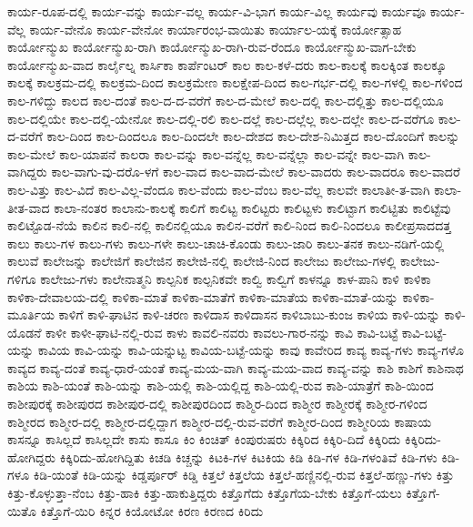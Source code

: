 {ಕಾರ್ಯ-ರೂಪ-ದಲ್ಲಿ
ಕಾರ್ಯ-ವನ್ನು
ಕಾರ್ಯ-ವಲ್ಲ
ಕಾರ್ಯ-ವಿ-ಭಾಗ
ಕಾರ್ಯ-ವಿಲ್ಲ
ಕಾರ್ಯವು
ಕಾರ್ಯವೂ
ಕಾರ್ಯ-ವೆಲ್ಲ
ಕಾರ್ಯ-ವೇನೊ
ಕಾರ್ಯ-ವೇನೋ
ಕಾರ್ಯಾರಂಭ-ವಾಯಿತು
ಕಾರ್ಯಾಲ-ಯಕ್ಕೆ
ಕಾರ್ಯೋತ್ಸಾಹ
ಕಾರ್ಯೋನ್ಮುಖ
ಕಾರ್ಯೋನ್ಮುಖ-ರಾಗಿ
ಕಾರ್ಯೋನ್ಮುಖ-ರಾಗಿ-ರುವ-ರೆಂದೂ
ಕಾರ್ಯೋನ್ಮುಖ-ವಾಗ-ಬೇಕು
ಕಾರ್ಯೋನ್ಮುಖ-ವಾದ
ಕಾರ್ಲೈಲ್ನ
ಕಾರ್ಸಿಕಾ
ಕಾರ್ಪೆಂಟರ್
ಕಾಲ
ಕಾಲ-ಕಳೆ-ದರು
ಕಾಲ-ಕಾಲಕ್ಕೆ
ಕಾಲಕ್ಕಿಂತ
ಕಾಲಕ್ಕೂ
ಕಾಲಕ್ಕೆ
ಕಾಲಕ್ರಮ-ದಲ್ಲಿ
ಕಾಲಕ್ರಮ-ದಿಂದ
ಕಾಲಕ್ರಮೇಣ
ಕಾಲಕ್ಷೇಪ-ದಿಂದ
ಕಾಲ-ಗರ್ಭ-ದಲ್ಲಿ
ಕಾಲ-ಗಳಲ್ಲಿ
ಕಾಲ-ಗಳಿಂದ
ಕಾಲ-ಗಳಿದ್ದು
ಕಾಲದ
ಕಾಲ-ದಂತೆ
ಕಾಲ-ದ-ದ-ವರೆಗೆ
ಕಾಲ-ದ-ಮೇಲೆ
ಕಾಲ-ದಲ್ಲಿ
ಕಾಲ-ದಲ್ಲಿತ್ತು
ಕಾಲ-ದಲ್ಲಿಯೂ
ಕಾಲ-ದಲ್ಲಿಯೇ
ಕಾಲ-ದಲ್ಲಿ-ಯೇನೋ
ಕಾಲ-ದಲ್ಲಿ-ರಲಿ
ಕಾಲ-ದಲ್ಲೆ
ಕಾಲ-ದಲ್ಲೆಲ್ಲ
ಕಾಲ-ದಲ್ಲೇ
ಕಾಲ-ದ-ವರೆಗೂ
ಕಾಲ-ದ-ವರೆಗೆ
ಕಾಲ-ದಿಂದ
ಕಾಲ-ದಿಂದಲೂ
ಕಾಲ-ದಿಂದಲೇ
ಕಾಲ-ದೇಶದ
ಕಾಲ-ದೇಶ-ನಿಮಿತ್ತದ
ಕಾಲ-ದೊಂದಿಗೆ
ಕಾಲನ್ನು
ಕಾಲ-ಮೇಲೆ
ಕಾಲ-ಯಾಪನೆ
ಕಾಲರಾ
ಕಾಲ-ವನ್ನು
ಕಾಲ-ವನ್ನೆಲ್ಲ
ಕಾಲ-ವನ್ನೆಲ್ಲಾ
ಕಾಲ-ವನ್ನೇ
ಕಾಲ-ವಾಗಿ
ಕಾಲ-ವಾಗಿದ್ದರು
ಕಾಲ-ವಾಗು-ವು-ದರೊ-ಳಗೆ
ಕಾಲ-ವಾದ
ಕಾಲ-ವಾದ-ಮೇಲೆ
ಕಾಲ-ವಾದರು
ಕಾಲ-ವಾದರೂ
ಕಾಲ-ವಾದರೆ
ಕಾಲ-ವಿತ್ತು
ಕಾಲ-ವಿದೆ
ಕಾಲ-ವಿಲ್ಲ-ವೆಂದೂ
ಕಾಲ-ವೆಂದು
ಕಾಲ-ವೆಂಬ
ಕಾಲ-ವೆಲ್ಲ
ಕಾಲವೇ
ಕಾಲಾತೀ-ತ-ವಾಗಿ
ಕಾಲಾ-ತೀತ-ವಾದ
ಕಾಲಾ-ನಂತರ
ಕಾಲಾನು-ಕಾಲಕ್ಕೆ
ಕಾಲಿಗೆ
ಕಾಲಿಟ್ಟ
ಕಾಲಿಟ್ಟರು
ಕಾಲಿಟ್ಟಳು
ಕಾಲಿಟ್ಟಾಗ
ಕಾಲಿಟ್ಟಿತು
ಕಾಲಿಟ್ಟೆವು
ಕಾಲಿಟ್ಟೊಡ-ನೆಯೆ
ಕಾಲಿನ
ಕಾಲಿ-ನಲ್ಲಿ
ಕಾಲಿನಲ್ಲಿಯೂ
ಕಾಲಿನ-ವರೆಗೆ
ಕಾಲಿ-ನಿಂದ
ಕಾಲಿ-ನಿಂದಲೂ
ಕಾಲೀಪ್ರಸಾದದತ್ತ
ಕಾಲು
ಕಾಲು-ಗಳ
ಕಾಲು-ಗಳು
ಕಾಲು-ಗಳೇ
ಕಾಲು-ಚಾಚಿ-ಕೊಂಡು
ಕಾಲು-ಜಾರಿ
ಕಾಲು-ತನಕ
ಕಾಲು-ನಡಿಗೆ-ಯಲ್ಲಿ
ಕಾಲುವೆ
ಕಾಲೇಜನ್ನು
ಕಾಲೇಜಿಗೆ
ಕಾಲೇಜಿನ
ಕಾಲೇಜಿ-ನಲ್ಲಿ
ಕಾಲೇಜಿ-ನಿಂದ
ಕಾಲೇಜು
ಕಾಲೇಜು-ಗಳಲ್ಲಿ
ಕಾಲೇಜು-ಗಳಿಗೂ
ಕಾಲೇಜು-ಗಳು
ಕಾಲೇನಾತ್ಮನಿ
ಕಾಲ್ಪನಿಕ
ಕಾಲ್ಪನಿಕವೇ
ಕಾಲ್ವಿ
ಕಾಲ್ವಿಗೆ
ಕಾಳನ್ನೂ
ಕಾಳ-ಪಾನಿ
ಕಾಳಿ
ಕಾಳಿಕಾ
ಕಾಳಿಕಾ-ದೇವಾಲಯ-ದಲ್ಲಿ
ಕಾಳಿಕಾ-ಮಾತೆ
ಕಾಳಿಕಾ-ಮಾತೆಗೆ
ಕಾಳಿಕಾ-ಮಾತೆಯ
ಕಾಳಿಕಾ-ಮಾತೆ-ಯನ್ನು
ಕಾಳಿಕಾ-ಮೂರ್ತಿಯ
ಕಾಳಿಗೆ
ಕಾಳಿ-ಘಾಟಿನ
ಕಾಳಿ-ಚರಣ
ಕಾಳಿದಾಸ
ಕಾಳಿದಾಸನ
ಕಾಳಿಬಾಬು-ಕುಂಜ
ಕಾಳಿಯ
ಕಾಳಿ-ಯನ್ನು
ಕಾಳಿ-ಯೊಡನೆ
ಕಾಳೀ
ಕಾಳೀ-ಘಾಟಿ-ನಲ್ಲಿ-ರುವ
ಕಾಳು
ಕಾವಲಿ-ನವರು
ಕಾವಲು-ಗಾರ-ನನ್ನು
ಕಾವಿ
ಕಾವಿ-ಬಟ್ಟೆ
ಕಾವಿ-ಬಟ್ಟೆ-ಯನ್ನು
ಕಾವಿಯ
ಕಾವಿ-ಯನ್ನು
ಕಾವಿ-ಯನ್ನುಟ್ಟ
ಕಾವಿಯ-ಬಟ್ಟೆ-ಯನ್ನು
ಕಾವು
ಕಾವೇರಿದ
ಕಾವ್ಯ
ಕಾವ್ಯ-ಗಳು
ಕಾವ್ಯ-ಗಳೊ
ಕಾವ್ಯದ
ಕಾವ್ಯ-ದಂತೆ
ಕಾವ್ಯ-ಧಾರೆ-ಯಂತೆ
ಕಾವ್ಯ-ಮಯ-ವಾಗಿ
ಕಾವ್ಯ-ಮಯ-ವಾದ
ಕಾವ್ಯ-ವನ್ನು
ಕಾಶಿ
ಕಾಶಿಗೆ
ಕಾಶಿನಾಥ
ಕಾಶಿಯ
ಕಾಶಿ-ಯಂತೆ
ಕಾಶಿ-ಯನ್ನು
ಕಾಶಿ-ಯಲ್ಲಿ
ಕಾಶಿ-ಯಲ್ಲಿದ್ದ
ಕಾಶಿ-ಯಲ್ಲಿ-ರುವ
ಕಾಶಿ-ಯಾತ್ರೆಗೆ
ಕಾಶಿ-ಯಿಂದ
ಕಾಶೀಪುರಕ್ಕೆ
ಕಾಶೀಪುರದ
ಕಾಶೀಪುರ-ದಲ್ಲಿ
ಕಾಶೀಪುರದಿಂದ
ಕಾಶ್ಮಿರ-ದಿಂದ
ಕಾಶ್ಮೀರ
ಕಾಶ್ಮೀರಕ್ಕೆ
ಕಾಶ್ಮೀರ-ಗಳಿಂದ
ಕಾಶ್ಮೀರದ
ಕಾಶ್ಮೀರ-ದಲ್ಲಿ
ಕಾಶ್ಮೀರ-ದಲ್ಲಿದ್ದಾಗ
ಕಾಶ್ಮೀರ-ದಲ್ಲಿ-ರುವ-ವರೆಗೆ
ಕಾಶ್ಮೀರ-ದಿಂದ
ಕಾಶ್ಮೀರಿಯ
ಕಾಷಾಯ
ಕಾಸನ್ನೂ
ಕಾಸಿಲ್ಲದೆ
ಕಾಸಿಲ್ಲದೇ
ಕಾಸು
ಕಾಸೂ
ಕಿಂ
ಕಿಂಚಿತ್
ಕಿಂಪುರುಷರು
ಕಿಕ್ಕಿರಿದ
ಕಿಕ್ಕಿರಿ-ದಿದೆ
ಕಿಕ್ಕಿರಿದು
ಕಿಕ್ಕಿರಿದು-ಹೋಗಿದ್ದರು
ಕಿಕ್ಕಿರಿದು-ಹೋಗಿದ್ದಿತು
ಕಿಚಡಿ
ಕಿಚ್ಚನ್ನು
ಕಿಟಕಿ-ಗಳ
ಕಿಟಕಿಯ
ಕಿಡಿ
ಕಿಡಿ-ಗಳ
ಕಿಡಿ-ಗಳಂತಿವೆ
ಕಿಡಿ-ಗಳು
ಕಿಡಿ-ಗಳೂ
ಕಿಡಿ-ಯಂತೆ
ಕಿಡಿ-ಯನ್ನು
ಕಿಡ್ಡರ್ಪೂರ್
ಕಿಡ್ಡಿ
ಕಿತ್ತಲೆ
ಕಿತ್ತಲೆಯ
ಕಿತ್ತಲೆ-ಹಣ್ಣಿನಲ್ಲಿ-ರುವ
ಕಿತ್ತಲೆ-ಹಣ್ಣು-ಗಳು
ಕಿತ್ತು
ಕಿತ್ತು-ಕೊಳ್ಳುತ್ತಾ-ನೆಂಬ
ಕಿತ್ತು-ಹಾಕಿ
ಕಿತ್ತು-ಹಾಕುತ್ತಿದ್ದರು
ಕಿತ್ತೊಗೆದು
ಕಿತ್ತೊಗೆಯ-ಬೇಕು
ಕಿತ್ತೊಗೆ-ಯಲು
ಕಿತ್ತೊಗೆ-ಯಿತೊ
ಕಿತ್ತೊಗೆ-ಯಿರಿ
ಕಿನ್ನರ
ಕಿಯೋಟೋ
ಕಿರಣ
ಕಿರಣದ
ಕಿರಿದು
}
